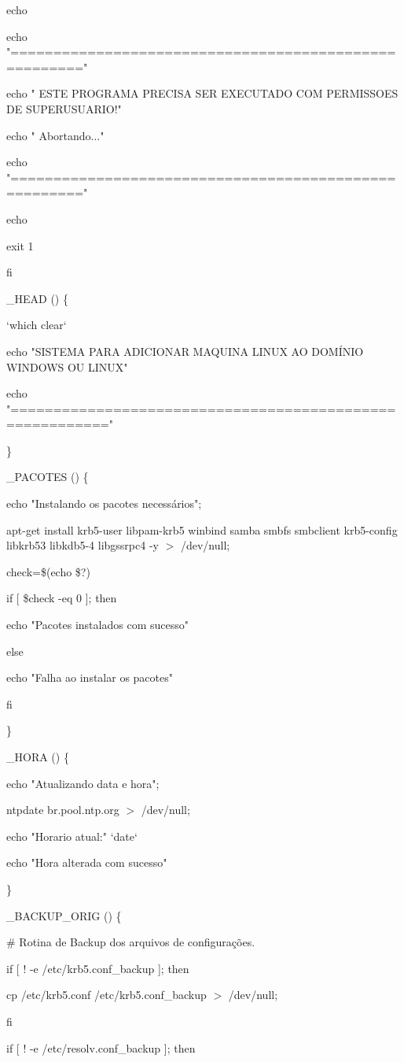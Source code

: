  	echo

  echo "======================================================"

  echo " ESTE PROGRAMA PRECISA SER EXECUTADO COM PERMISSOES DE SUPERUSUARIO!"  

  echo " Abortando..."

  echo "======================================================"

  echo

  exit 1

fi

\_HEAD () \{

`which clear`

echo "SISTEMA PARA ADICIONAR MAQUINA LINUX AO DOMÍNIO WINDOWS OU LINUX"

echo "========================================================="

\}

\_PACOTES () \{

        echo "Instalando os pacotes necessários";       


  apt-get install krb5-user libpam-krb5 winbind samba smbfs smbclient krb5-config libkrb53 libkdb5-4 libgssrpc4 -y $>$ /dev/null;
  
      check=\$(echo \$?)

        if [ \$check -eq 0 ]; then

           echo "Pacotes instalados com sucesso"

        else

           echo "Falha ao instalar os pacotes"

        fi

\}

\_HORA () \{

        echo "Atualizando data e hora";

        ntpdate br.pool.ntp.org $>$ /dev/null;

        echo "Horario atual:" `date`

        echo "Hora alterada com sucesso"

\}

\_BACKUP\_ORIG () \{

  \# Rotina de Backup dos arquivos de configurações.

	if [ ! -e /etc/krb5.conf\_backup ]; then

		cp /etc/krb5.conf /etc/krb5.conf\_backup $>$ /dev/null;

	fi

	if [ ! -e /etc/resolv.conf\_backup ]; then


